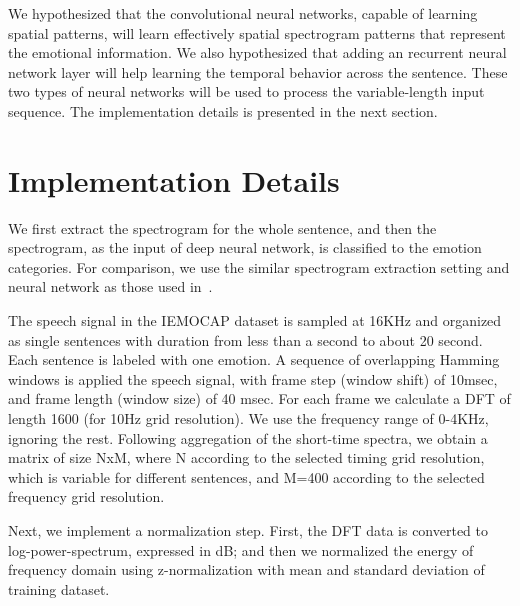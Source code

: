 \documentclass[a4paper]{article}
\begin{document}
We hypothesized that the convolutional neural networks, capable of learning spatial patterns, will learn effectively spatial spectrogram patterns that represent the emotional information. We also hypothesized that adding an recurrent neural network layer will help learning the temporal behavior across the sentence. These two types of neural networks will be used to process the variable-length input sequence. The implementation details is presented in the next section.  

\section{Implementation Details}
\label{sec:implementation_details}

We first extract the spectrogram for the whole sentence, and then the spectrogram, as the input of deep neural network, is classified to the emotion categories. For comparison, we use the similar spectrogram extraction setting and neural network as those used in~\cite{satt2017}.



The speech signal in the IEMOCAP dataset is sampled at 16KHz and organized as single sentences with duration from less than a second to about 20 second. Each sentence is labeled with one emotion. A sequence of overlapping Hamming windows is applied the speech signal, with frame step (window shift) of 10msec, and frame length (window size) of 40 msec. For each frame we calculate a DFT of length 1600 (for 10Hz grid resolution). We use the frequency range of 0-4KHz, ignoring the rest. Following aggregation of the short-time spectra, we obtain a matrix of size NxM, where N according to the selected timing grid resolution, which is variable for different sentences,  and M=400 according to the selected frequency grid resolution.

Next, we implement a normalization step. First, the DFT data is converted to log-power-spectrum, expressed in dB; and then we normalized the energy of frequency domain using z-normalization with mean and standard deviation of training dataset.
\end{document}
